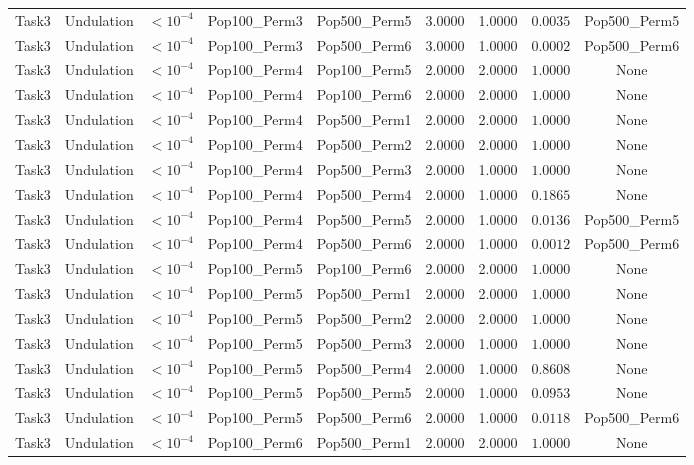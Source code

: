 \documentclass[8pt]{article}
\begin{document}
\begin{longtable}{llccccccc}
Task3 & Undulation & $< 10^{-4}$ & Pop100\_Perm3 & Pop500\_Perm5 & 3.0000 & 1.0000 & $0.0035$ & Pop500\_Perm5 \\
Task3 & Undulation & $< 10^{-4}$ & Pop100\_Perm3 & Pop500\_Perm6 & 3.0000 & 1.0000 & $0.0002$ & Pop500\_Perm6 \\
Task3 & Undulation & $< 10^{-4}$ & Pop100\_Perm4 & Pop100\_Perm5 & 2.0000 & 2.0000 & $1.0000$ & None \\
Task3 & Undulation & $< 10^{-4}$ & Pop100\_Perm4 & Pop100\_Perm6 & 2.0000 & 2.0000 & $1.0000$ & None \\
Task3 & Undulation & $< 10^{-4}$ & Pop100\_Perm4 & Pop500\_Perm1 & 2.0000 & 2.0000 & $1.0000$ & None \\
Task3 & Undulation & $< 10^{-4}$ & Pop100\_Perm4 & Pop500\_Perm2 & 2.0000 & 2.0000 & $1.0000$ & None \\
Task3 & Undulation & $< 10^{-4}$ & Pop100\_Perm4 & Pop500\_Perm3 & 2.0000 & 1.0000 & $1.0000$ & None \\
Task3 & Undulation & $< 10^{-4}$ & Pop100\_Perm4 & Pop500\_Perm4 & 2.0000 & 1.0000 & $0.1865$ & None \\
Task3 & Undulation & $< 10^{-4}$ & Pop100\_Perm4 & Pop500\_Perm5 & 2.0000 & 1.0000 & $0.0136$ & Pop500\_Perm5 \\
Task3 & Undulation & $< 10^{-4}$ & Pop100\_Perm4 & Pop500\_Perm6 & 2.0000 & 1.0000 & $0.0012$ & Pop500\_Perm6 \\
Task3 & Undulation & $< 10^{-4}$ & Pop100\_Perm5 & Pop100\_Perm6 & 2.0000 & 2.0000 & $1.0000$ & None \\
Task3 & Undulation & $< 10^{-4}$ & Pop100\_Perm5 & Pop500\_Perm1 & 2.0000 & 2.0000 & $1.0000$ & None \\
Task3 & Undulation & $< 10^{-4}$ & Pop100\_Perm5 & Pop500\_Perm2 & 2.0000 & 2.0000 & $1.0000$ & None \\
Task3 & Undulation & $< 10^{-4}$ & Pop100\_Perm5 & Pop500\_Perm3 & 2.0000 & 1.0000 & $1.0000$ & None \\
Task3 & Undulation & $< 10^{-4}$ & Pop100\_Perm5 & Pop500\_Perm4 & 2.0000 & 1.0000 & $0.8608$ & None \\
Task3 & Undulation & $< 10^{-4}$ & Pop100\_Perm5 & Pop500\_Perm5 & 2.0000 & 1.0000 & $0.0953$ & None \\
Task3 & Undulation & $< 10^{-4}$ & Pop100\_Perm5 & Pop500\_Perm6 & 2.0000 & 1.0000 & $0.0118$ & Pop500\_Perm6 \\
Task3 & Undulation & $< 10^{-4}$ & Pop100\_Perm6 & Pop500\_Perm1 & 2.0000 & 2.0000 & $1.0000$ & None \\

\end{longtable}
\end{document}
